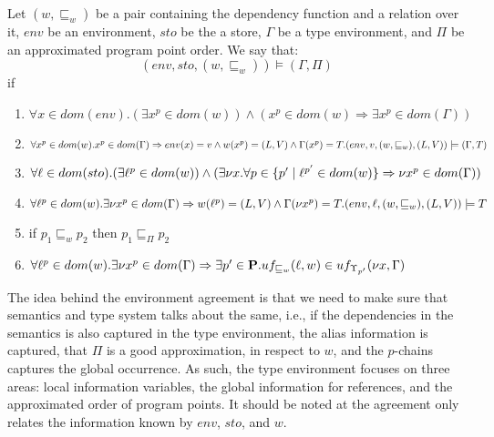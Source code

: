 \documentclass[acmsmall,sigplan]{acmart}
\begin{document}
\begin{definition}\label{def:EnvAgree}
	Let $(w,\sqsubseteq_w)$ be a pair containing the dependency function and a relation over it, $env$ be an environment, $sto$ be the a store, $\Gamma$ be a type environment, and $\Pi$ be an approximated program point order.
	We say that:
	$$(env,sto,(w,\sqsubseteq_w))\models(\Gamma,\Pi)$$
	if 
	\begin{enumerate}
		\item $\forall x\in dom(env).(\exists x^p\in dom(w))\wedge(x^p\in dom(w)\Rightarrow \exists x^p\in dom(\Gamma))$
		\item $\forall x^p\in dom(w).x^p\in dom(\Gamma)\Rightarrow env(x)=v\wedge w(x^p)=(L,V)\wedge\Gamma(x^p)=T.\\(env,v,(w,\sqsubseteq_w),(L,V))\models (\Gamma,T)$
		\item $\forall \ell\in dom(sto).(\exists \ell^p\in dom(w))\wedge(\exists \nu x.\forall p\in\{p'\mid\ell^{p'}\in dom(w)\}\Rightarrow\nu x^p\in dom(\Gamma))$
		\item $\forall \ell^p \in dom(w).\exists\nu x^{p}\in dom(\Gamma)\Rightarrow w(\ell^p)=(L,V)\wedge\Gamma(\nu x^{p})=T.(env,\ell,(w,\sqsubseteq_w),(L,V))\models T$
		\item if $p_1\sqsubseteq_w p_2$ then $p_1\sqsubseteq_\Pi p_2$
	\item $\forall \ell^p\in dom(w).\exists \nu x^p\in dom(\Gamma)\Rightarrow\exists p'\in\textbf{P}.uf_{\sqsubseteq_w}(\ell,w)\in uf_{\Upsilon_{p'}}(\nu x,\Gamma)$
	\end{enumerate}
\end{definition}
The idea behind the environment agreement is that we need to make sure that semantics and type system talks about the same, i.e., if the dependencies in the semantics is also captured in the type environment, the alias information is captured, 
that $\Pi$ is a good approximation, in respect to $w$, and the $p$-chains captures the global occurrence.
As such, the type environment focuses on three areas:  local information variables,  the global information for references, and  the approximated order of program points.
It should be noted at the agreement only relates the information known by $env$, $sto$, and $w$.
\end{document}
